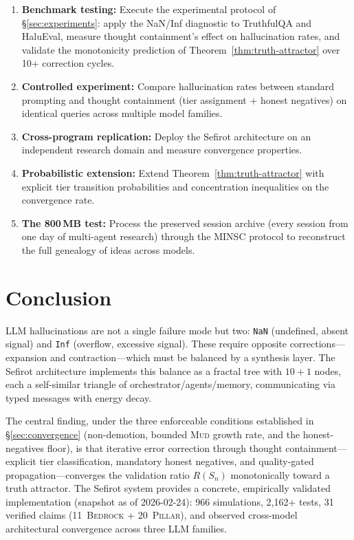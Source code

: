 \documentclass[11pt]{article}
\theoremstyle{definition}
\theoremstyle{remark}
\newcommand{\NaN}{\texttt{NaN}}
\newcommand{\Inf}{\texttt{Inf}}
\newcommand{\BEDROCK}{\textsc{Bedrock}}
\newcommand{\PILLAR}{\textsc{Pillar}}
\newcommand{\MUD}{\textsc{Mud}}
\begin{document}
\begin{enumerate}
  \item \textbf{Benchmark testing:}  Execute the experimental protocol of
    \S\ref{sec:experiments}: apply the NaN/Inf diagnostic to TruthfulQA and
    HaluEval, measure thought containment's effect on hallucination rates, and
    validate the monotonicity prediction of Theorem~\ref{thm:truth-attractor}
    over 10+ correction cycles.
  \item \textbf{Controlled experiment:}  Compare hallucination rates between
    standard prompting and thought containment (tier assignment + honest
    negatives) on identical queries across multiple model families.
  \item \textbf{Cross-program replication:}  Deploy the Sefirot architecture on
    an independent research domain and measure convergence properties.
  \item \textbf{Probabilistic extension:}  Extend
    Theorem~\ref{thm:truth-attractor} with explicit tier transition
    probabilities and concentration inequalities on the convergence rate.
  \item \textbf{The 800\,MB test:}  Process the preserved session archive (every
    session from one day of multi-agent research) through the MINSC protocol to
    reconstruct the full genealogy of ideas across models.
\end{enumerate}

\section{Conclusion}
\label{sec:conclusion}

LLM hallucinations are not a single failure mode but two: \NaN{} (undefined,
absent signal) and \Inf{} (overflow, excessive signal).  These require opposite
corrections---expansion and contraction---which must be balanced by a synthesis
layer.  The Sefirot architecture implements this balance as a fractal tree with
$10 + 1$ nodes, each a self-similar triangle of orchestrator/agents/memory,
communicating via typed messages with energy decay.

The central finding, under the three enforceable conditions established in
\S\ref{sec:convergence} (non-demotion, bounded \MUD{} growth rate, and the
honest-negatives floor), is that iterative error correction through thought
containment---explicit tier classification, mandatory honest negatives, and
quality-gated propagation---converges the validation ratio $R(S_n)$ monotonically
toward a truth attractor.  The Sefirot system provides a concrete, empirically
validated implementation (snapshot as of 2026-02-24): 966 simulations, 2,162+
tests, 31 verified claims
(11~\BEDROCK{} + 20~\PILLAR{}), and observed cross-model architectural
convergence across three LLM families.
\end{document}
